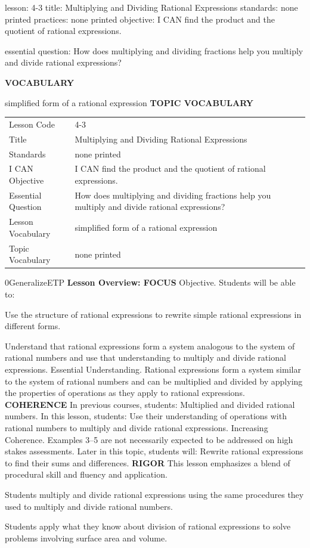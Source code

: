 \documentclass{article}
\newenvironment{lesson-meta}{}{}        %
\newenvironment{te-addendum}[2]{}{}     %
\newcommand{\te}[1]{}                   %
\begin{document}
\begin{lesson-meta}
lesson: 4-3
title: Multiplying and Dividing Rational Expressions
standards: none printed
practices: none printed
objective: I CAN find the product and the quotient of rational expressions.

essential question: How does multiplying and dividing fractions help you multiply and divide rational expressions?

\textbf{VOCABULARY}
\item simplified form of a rational expression
\textbf{TOPIC VOCABULARY}
\te{No topic vocabulary list is printed on these lesson pages.}
\begin{tabular}{ll}
Lesson Code & 4-3 \\
Title & Multiplying and Dividing Rational Expressions \\
Standards & none printed \\
I CAN Objective & I CAN find the product and the quotient of rational expressions. \\
Essential Question & How does multiplying and dividing fractions help you multiply and divide rational expressions? \\
Lesson Vocabulary & simplified form of a rational expression \\
Topic Vocabulary & none printed \\
\end{tabular}
\end{lesson-meta}
\begin{te-addendum}{0}{GeneralizeETP}
\textbf{Lesson Overview: FOCUS}
Objective. Students will be able to:
\item Use the structure of rational expressions to rewrite simple rational expressions in different forms.
\item Understand that rational expressions form a system analogous to the system of rational numbers and use that understanding to multiply and divide rational expressions.
Essential Understanding. Rational expressions form a system similar to the system of rational numbers and can be multiplied and divided by applying the properties of operations as they apply to rational expressions.
\textbf{COHERENCE}
In previous courses, students: Multiplied and divided rational numbers.
In this lesson, students: Use their understanding of operations with rational numbers to multiply and divide rational expressions.
Increasing Coherence. Examples 3--5 are not necessarily expected to be addressed on high stakes assessments.
Later in this topic, students will: Rewrite rational expressions to find their sums and differences.
\textbf{RIGOR}
This lesson emphasizes a blend of procedural skill and fluency and application.
\item Students multiply and divide rational expressions using the same procedures they used to multiply and divide rational numbers.
\item Students apply what they know about division of rational expressions to solve problems involving surface area and volume.
\end{te-addendum}
\end{document}
